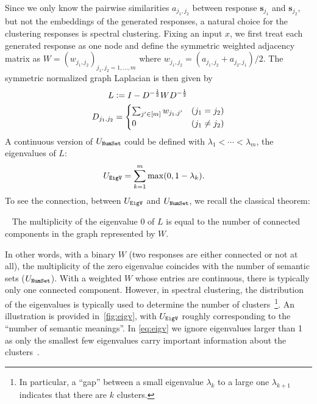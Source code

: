 Since we only know the pairwise similarities  $a_{j_1,j_2}$ between response $\mathbf{s}_{j_1}$ and $\mathbf{s}_{j_2}$, but not the embeddings of the generated responses, a natural choice for the clustering responses is spectral clustering. 
Fixing an input $x$, we first treat each generated response as one node and define the symmetric weighted adjacency matrix as $W = (w_{j_1,j_2})_{j_1,j_2=1,\ldots,m}$ where 
$w_{j_1,j_2} = (a_{j_1,j_2}+a_{j_2,j_1})/2$.
The symmetric normalized graph Laplacian is then given by
\begin{align}
    L &\vcentcolon= I - D^{-\frac{1}{2}}WD^{-\frac{1}{2}}\\
    D_{j_1,j_2} & =\begin{cases}\sum_{j'\in[m]} w_{j_1,j'} & (j_1=j_2)\\ 0 & (j_1\neq j_2)\end{cases} \label{eq:D}
\end{align}
A continuous version of $U_{\texttt{NumSet}}$ could be defined with $\lambda_1<\cdots<\lambda_m$, the eigenvalues of $L$:
\begin{align}
    U_{\texttt{EigV}} &= \sum_{k=1}^m \max(0,1-\lambda_k) \label{eq:eigv}.
\end{align}
To see the connection, between $U_{\texttt{EigV}}$ and $U_{\texttt{NumSet}}$, we recall the classical theorem:
\begin{theorem}~\citep{von2007tutorial}\label{thm:connectedcomponent}
    The multiplicity of the eigenvalue $0$ of $L$ is equal to the number of connected components in the graph represented by $W$.
\end{theorem}
In other words, with a binary $W$ (two responses are either connected or not at all), the multiplicity of the zero eigenvalue coincides with the number of semantic sets ($U_{\texttt{NumSet}}$).
With a weighted $W$ whose entries are continuous, there is typically only one connected component. 
However, in spectral clustering, the distribution of the eigenvalues is typically used to determine the number of clusters~\citep{von2007tutorial}\footnote{
In particular, a ``gap'' between a small eigenvalue $\lambda_k$ to a large one $\lambda_{k+1}$ indicates that there are $k$ clusters.}. 
An illustration is provided in~\cref{fig:eigv}, with $U_{\texttt{EigV}}$ roughly corresponding to the ``number of semantic meanings''.
In \cref{eq:eigv} we ignore eigenvalues larger than 1 as only the smallest few eigenvalues carry important information about the clusters~\citep{von2007tutorial}.



